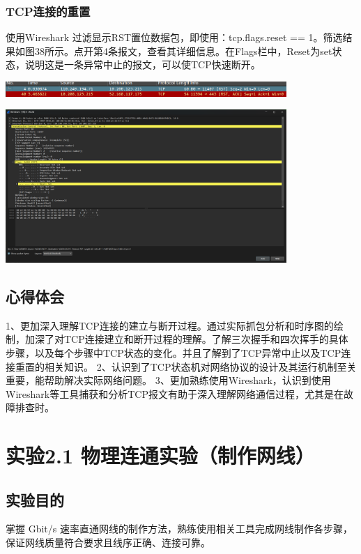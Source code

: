 \documentclass{article}
\begin{document}
\subsubsection{TCP连接的重置}
使用Wireshark 过滤显示RST置位数据包，即使用：tcp.flags.reset == 1。筛选结果如图38所示。点开第4条报文，查看其详细信息。在Flags栏中，Reset为set状态，说明这是一条异常中止的报文，可以使TCP快速断开。

\vspace{10pt}
\centerline{\includegraphics[width=0.8\textwidth]{1_2_images/6.png}}
\vspace{10pt}

\vspace{10pt}
\centerline{\includegraphics[width=0.8\textwidth]{1_2_images/7.png}}
\vspace{10pt}

\subsection{心得体会}
1、更加深入理解TCP连接的建立与断开过程。通过实际抓包分析和时序图的绘制，加深了对TCP连接建立和断开过程的理解。了解三次握手和四次挥手的具体步骤，以及每个步骤中TCP状态的变化。并且了解到了TCP异常中止以及TCP连接重置的相关知识。
2、认识到了TCP状态机对网络协议的设计及其运行机制至关重要，能帮助解决实际网络问题。
3、更加熟练使用Wireshark，认识到使用Wireshark等工具捕获和分析TCP报文有助于深入理解网络通信过程，尤其是在故障排查时。




\newpage\section{实验2.1 物理连通实验（制作网线）}
\subsection{实验目的}
掌握 Gbit/s 速率直通网线的制作方法，熟练使用相关工具完成网线制作各步骤，保证网线质量符合要求且线序正确、连接可靠。
\end{document}
